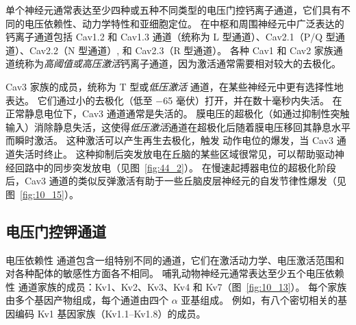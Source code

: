 单个神经元通常表达至少四种或五种不同类型的电压门控钙离子通道，它们具有不同的电压依赖性、动力学特性和亚细胞定位。
在中枢和周围神经元中广泛表达的钙离子通道包括 Cav1.2 和 Cav1.3 通道（统称为 L 型通道）、Cav2.1（P/Q 型通道）、Cav2.2（N 型通道）, 和 Cav2.3（R 型通道）。
各种 Cav1 和 Cav2 家族通道统称为\textit{高阈值或高压激活}钙离子通道，因为激活通常需要相对较大的去极化。


Cav3 家族的成员，统称为 T 型或\textit{低压激活} 通道，在某些神经元中更有选择性地表达。
它们通过小的去极化（低至 −65 毫伏）打开，并在数十毫秒内失活。
在正常静息电位下，Cav3 通道通常是失活的。
膜电压的超极化（如通过抑制性突触输入）消除静息失活，这使得\textit{低压激活}通道在超极化后随着膜电压移回其静息水平而瞬时激活。
这种激活可以产生再生去极化，触发  动作电位的爆发，当 Cav3 通道失活时终止。 
这种抑制后突发放电在丘脑的某些区域很常见，可以帮助驱动神经回路中的同步突发放电（见图~\ref{fig:44_2}）。 
在慢速起搏器电位的超极化阶段后，Cav3 通道的类似反弹激活有助于一些丘脑皮层神经元的自发节律性爆发（见图~\ref{fig:10_15}）。



\subsection{电压门控钾通道}

电压依赖性  通道包含一组特别不同的通道，它们在激活动力学、电压激活范围和对各种配体的敏感性方面各不相同。
哺乳动物神经元通常表达至少五个电压依赖性  通道家族的成员：Kv1、Kv2、Kv3、Kv4 和 Kv7（图~\ref{fig:10_13}）。
每个家族由多个基因产物组成，每个通道由四个 $\alpha$ 亚基组成。
例如，有八个密切相关的基因编码 Kv1 基因家族（Kv1.1–Kv1.8）的成员。


